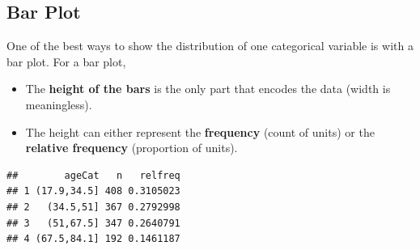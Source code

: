 \documentclass[
]{book}
\newenvironment{Shaded}{\begin{snugshade}}{\end{snugshade}}
\newcommand{\CommentTok}[1]{\textcolor[rgb]{0.56,0.35,0.01}{\textit{#1}}}
\newcommand{\DataTypeTok}[1]{\textcolor[rgb]{0.13,0.29,0.53}{#1}}
\newcommand{\KeywordTok}[1]{\textcolor[rgb]{0.13,0.29,0.53}{\textbf{#1}}}
\newcommand{\NormalTok}[1]{#1}
\newcommand{\OperatorTok}[1]{\textcolor[rgb]{0.81,0.36,0.00}{\textbf{#1}}}
\newcommand{\StringTok}[1]{\textcolor[rgb]{0.31,0.60,0.02}{#1}}
\providecommand{\tightlist}{%
  \setlength{\itemsep}{0pt}\setlength{\parskip}{0pt}}
\begin{document}
\hypertarget{bar-plot}{%
\subsection{Bar Plot}\label{bar-plot}}

One of the best ways to show the distribution of one categorical variable is with a bar plot. For a bar plot,

\begin{itemize}
\tightlist
\item
  The \textbf{height of the bars} is the only part that encodes the data (width is meaningless).
\item
  The height can either represent the \textbf{frequency} (count of units) or the \textbf{relative frequency} (proportion of units).
\end{itemize}

\begin{Shaded}
\end{Shaded}

\begin{verbatim}
##        ageCat   n   relfreq
## 1 (17.9,34.5] 408 0.3105023
## 2   (34.5,51] 367 0.2792998
## 3   (51,67.5] 347 0.2640791
## 4 (67.5,84.1] 192 0.1461187
\end{verbatim}

\begin{Shaded}
\end{Shaded}
\end{document}
